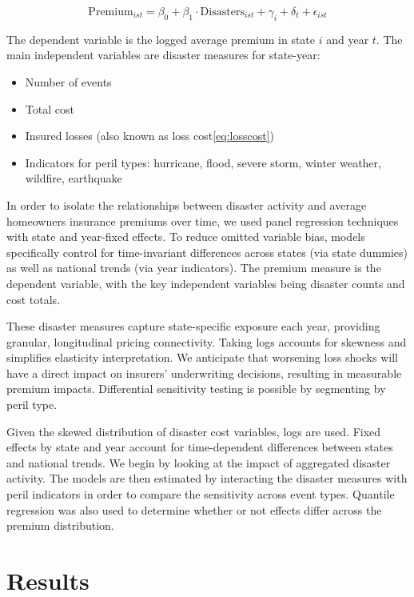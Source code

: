 \documentclass[12pt]{article}
\begin{document}
\begin{equation} 
    \mathrm{Premium}_{ist} = \beta_0 + \beta_1 \cdot \mathrm{Disasters}_{ist} + \gamma_i + \delta_t + \epsilon_{ist}
\end{equation}

The dependent variable is the logged average premium in state $i$ and year $t$. The main independent variables are disaster measures 
for state-year:

\begin{itemize} 
    \item Number of events 
    \item Total cost 
    \item Insured losses (also known as loss cost\ref{eq:losscost})
    \item Indicators for peril types: hurricane, flood, severe storm, winter weather, wildfire, earthquake 
\end{itemize}


In order to isolate the relationships between disaster activity and average homeowners insurance premiums over time, we used 
panel regression techniques with state and year-fixed effects. To reduce omitted variable bias, models specifically control for 
time-invariant differences across states (via state dummies) as well as national trends (via year indicators). The premium measure is 
the dependent variable, with the key independent variables being disaster counts and cost totals.

These disaster measures capture state-specific exposure each year, providing granular, longitudinal pricing connectivity. Taking logs 
accounts for skewness and simplifies elasticity interpretation. We anticipate that worsening loss shocks will have a direct impact on 
insurers' underwriting decisions, resulting in measurable premium impacts. Differential sensitivity testing is possible by segmenting 
by peril type.

Given the skewed distribution of disaster cost variables, logs are used. Fixed effects by state and year account for time-dependent 
differences between states and national trends. We begin by looking at the impact of aggregated disaster activity. The models are then 
estimated by interacting the disaster measures with peril indicators in order to compare the sensitivity across event types. Quantile 
regression was also used to determine whether or not effects differ across the premium distribution.


\section{Results}
\label{sec:resu}
\end{document}
